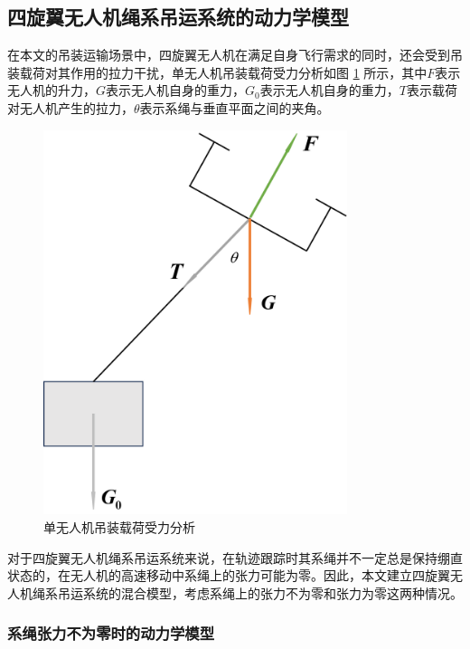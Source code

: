 \documentclass[lang=chs, degree=master, blindreview=true, winfonts=true]{yanputhesis}
\begin{document}
\subsection{四旋翼无人机绳系吊运系统的动力学模型}
在本文的吊装运输场景中，四旋翼无人机在满足自身飞行需求的同时，还会受到吊装载荷对其作用的拉力干扰，单无人机吊装载荷受力分析如图 \ref{2_2} 所示，其中$F$表示无人机的升力，$G$表示无人机自身的重力，$G_0$表示无人机自身的重力，$T$表示载荷对无人机产生的拉力，$\theta$表示系绳与垂直平面之间的夹角。
\begin{figure}[hbt!]
	\centering
	\includegraphics[width=21pc]{picture/2_2.png} 
	\caption{单无人机吊装载荷受力分析} \label{2_2}
\end{figure}

对于四旋翼无人机绳系吊运系统来说，在轨迹跟踪时其系绳并不一定总是保持绷直状态的，在无人机的高速移动中系绳上的张力可能为零。因此，本文建立四旋翼无人机绳系吊运系统的混合模型，考虑系绳上的张力不为零和张力为零这两种情况。

\subsubsection{系绳张力不为零时的动力学模型}
\end{document}
